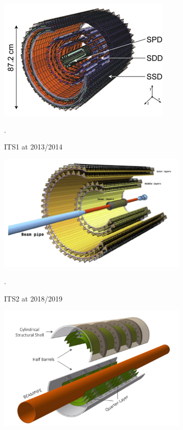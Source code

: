 \documentclass[12pt,a4paper]{article}
\begin{document}
\begin{figure}[hbt]
    \centering
    \begin{subfigure}[b]{0.3\textwidth}
        \includegraphics[width=\textwidth]{figure/ITS1.png}
        \caption{\centering ITS1 at 2013/2014 \cite{Aamodt:2010aa}}.
        \label{fig:ITS1}
    \end{subfigure}
    \begin{subfigure}[b]{0.3\textwidth}
        \includegraphics[width=\textwidth]{figure/ITS2.png}
        \caption{\centering ITS2 at 2018/2019 \cite{MAGER2016434}}.
        \label{fig:ITS2}
    \end{subfigure}
    \begin{subfigure}[b]{0.3\textwidth}
        \includegraphics[width=\textwidth]{figure/ITS3.jpg}

\end{subfigure}
\end{figure}
\end{document}
